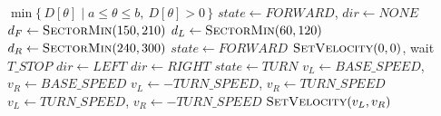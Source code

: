 \documentclass{article}
\begin{document}
\begin{algorithm}
\caption{LiDAR Obstacle Avoidance with Stop and Turn Lock}
\begin{algorithmic}[1]
     
        \State \Return $\min\{\, D[\theta] \mid a \le \theta \le b,\ D[\theta] > 0 \,\}$
    \EndFunction
    \Statex
        \State $state \gets FORWARD$, \; $dir \gets NONE$
            \State $d_F \gets \Call{SectorMin}{150, 210}$ 
            \State $d_L \gets \Call{SectorMin}{60, 120}$
            \State $d_R \gets \Call{SectorMin}{240, 300}$
             
                    \State $state \gets FORWARD$
                \EndIf
             
                \State $\textproc{SetVelocity}(0, 0)$, \; wait $T\_STOP$
                    \State $dir \gets LEFT$
                \Else
                    \State $dir \gets RIGHT$
                \EndIf
                \State $state \gets TURN$
            \EndIf
                \State $v_L \gets BASE\_SPEED$, \; $v_R \gets BASE\_SPEED$
                \State $v_L \gets -TURN\_SPEED$, \; $v_R \gets TURN\_SPEED$
            \Else
                \State $v_L \gets TURN\_SPEED$, \; $v_R \gets -TURN\_SPEED$
            \EndIf
            \State $\textproc{SetVelocity}(v_L, v_R)$
        \EndWhile
    \EndProcedure
\end{algorithmic}
\end{algorithm}
\end{document}
